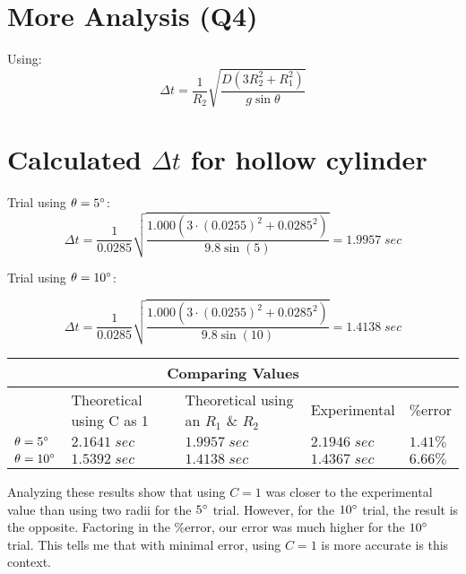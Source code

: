 \section{More Analysis (Q4)}

\noindent Using:
\begin{equation*}
  \Delta t = \frac{1}{R_2} \sqrt{ \frac {D(3R_2^2 + R_1^2)}{g \sin \theta} }
\end{equation*}

\section*{Calculated $\Delta t$ for hollow cylinder}

\noindent Trial using $\theta = 5\degree$:\\
\begin{equation*}
  \Delta t = \frac{1}{0.0285} \sqrt{ \frac {1.000(3 \cdot (0.0255)^2 + 0.0285^2)}{9.8 \sin (5)} } = 1.9957 \; sec
\end{equation*}

\noindent Trial using $\theta = 10\degree$:

\begin{equation*}
  \Delta t = \frac{1}{0.0285} \sqrt{ \frac {1.000(3 \cdot (0.0255)^2 + 0.0285^2)}{9.8 \sin (10)} } = 1.4138 \; sec
\end{equation*}

\begin{center}
  \begin{tabular} { |p{2cm}|p{2cm}|p{2cm}|p{2cm}|p{2cm}| }
    \hline
    \multicolumn{5}{|c|}{ Comparing Values } \\
    \hline 
    \centering & Theoretical using C as 1 & Theoretical using an $R_1$ \& $R_2$ &  Experimental & \%error \\ 
    \hline
    $\theta = 5\degree$ & $2.1641 \; sec$ & $1.9957 \; sec$ & $2.1946 \; sec$ & $1.41\%$ \\
    \hline
    $\theta = 10\degree$ & $1.5392 \; sec$ & $1.4138 \; sec$ & $1.4367 \; sec$ & $6.66\%$ \\
    \hline
  \end{tabular}
\end{center}

Analyzing these results show that using $C = 1$ was closer to the experimental value than
using two radii for the $5\degree$ trial. However, for the $10\degree$ trial, the result 
is the opposite. Factoring in the \%error, our error was much higher for the $10\degree$ trial.
This tells me that with minimal error, using $C = 1$ is more accurate is this context.

